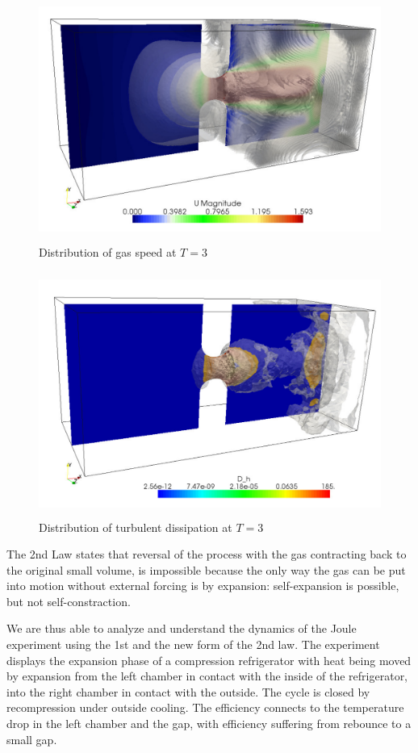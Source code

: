 \begin{figure}[bhpt]
\centerline{
\includegraphics[height=8.0cm]
{chapters/hoffman-3/pdf/vel_T_3.pdf}
}
\caption{Distribution of gas speed at $T=3$}
\label{vel3}
\end{figure}

\begin{figure}[bhpt]
\centerline{
\includegraphics[height=8.0cm]
{chapters/hoffman-3/pdf/tur_disp.pdf}
}
\caption{Distribution of turbulent dissipation at $T=3$}
\label{tur_disp_dist}
\end{figure}


The 2nd Law states that reversal of
the process with the gas contracting back to the original small volume,
is impossible because the only way the gas can be put into motion without
external forcing is
by expansion: self-expansion is possible, but not self-constraction.

We are thus able to analyze and understand the dynamics of the Joule experiment
using the 1st and
the new form of the 2nd law. The experiment displays the expansion phase of a
compression refrigerator
with heat being moved by expansion from the left chamber in contact with the
inside of the refrigerator,
into the right chamber in contact with the outside. The cycle is closed by
recompression under outside cooling.
The efficiency connects to the temperature drop in the left chamber and the gap,
with efficiency suffering from
rebounce to a small gap.

